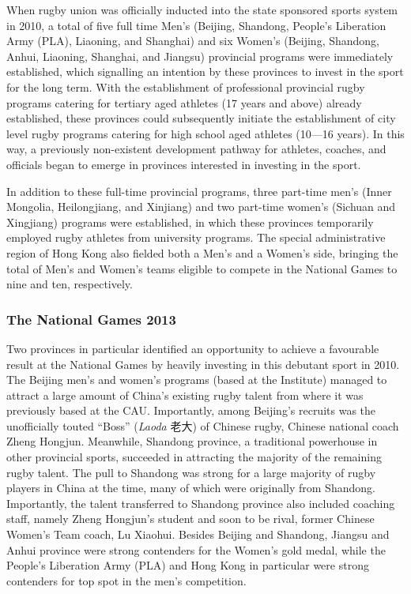 \begin{CJK}{UTF8}{gbsn}
When rugby union was officially inducted into the state sponsored sports system in 2010, a total of five full time Men's (Beijing, Shandong, People's Liberation Army (PLA), Liaoning, and Shanghai) and six Women's (Beijing, Shandong, Anhui, Liaoning, Shanghai, and Jiangsu) provincial programs were immediately established, which signalling an intention by these provinces to invest in the sport for the long term.  With the establishment of professional provincial rugby programs catering for tertiary aged athletes (17 years and above) already established, these provinces could subsequently initiate the establishment of city level rugby programs catering for high school aged athletes (10---16 years).  In this way, a previously non-existent development pathway for athletes, coaches, and officials began to emerge in provinces interested in investing in the sport.

In addition to these full-time provincial programs, three part-time men's (Inner Mongolia, Heilongjiang, and Xinjiang) and two part-time women's (Sichuan and Xingjiang) programs were established, in which these provinces temporarily employed rugby athletes from university programs. The special administrative region of Hong Kong also fielded both a Men's and a Women's side, bringing the total of Men's and Women's teams eligible to compete in the National Games to nine and ten, respectively.

\subsubsection{The National Games 2013\label{sect:fallFromGrace}}
Two provinces in particular identified an opportunity to achieve a favourable result at the National Games by heavily investing in this debutant sport in 2010.  The Beijing men's and women's programs (based at the Institute) managed to attract a large amount of China's existing rugby talent from where it was previously based at the CAU.  Importantly, among Beijing's recruits was the unofficially touted ``Boss''  (\textit{Laoda} 老大) of Chinese rugby, Chinese national coach Zheng Hongjun.  Meanwhile, Shandong province, a traditional powerhouse in other provincial sports, succeeded in attracting the majority of the remaining rugby talent.  The pull to Shandong was strong for a large majority of rugby players in China at the time, many of which were originally from Shandong.  Importantly, the talent transferred to Shandong province also included coaching staff, namely Zheng Hongjun's student and soon to be rival, former Chinese Women's Team coach, Lu Xiaohui.  Besides Beijing and Shandong, Jiangsu and Anhui province were strong contenders for the Women's gold medal, while the People's Liberation Army (PLA) and Hong Kong in particular were strong contenders for top spot in the men's competition.


\end{CJK}
